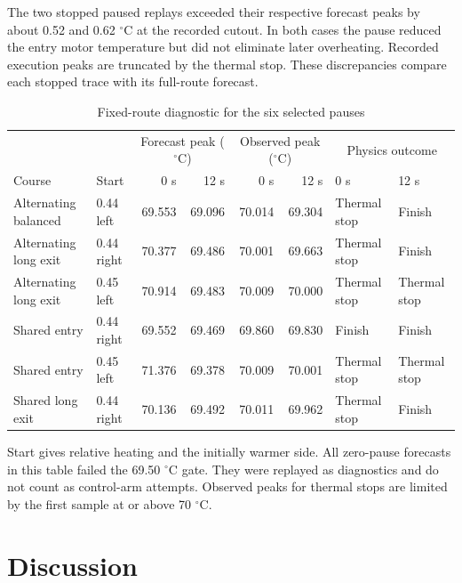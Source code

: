 \documentclass{ieeeaccess}
\begin{document}
The two stopped paused replays exceeded their respective forecast peaks by about 0.52 and 0.62 \ensuremath{{}^{\circ}\mathrm{C}} at the recorded cutout. In both cases the pause reduced the entry motor temperature but did not eliminate later overheating. Recorded execution peaks are truncated by the thermal stop. These discrepancies compare each stopped trace with its full-route forecast.

\begin{table}[!t]
\caption{Fixed-route diagnostic for the six selected pauses}
\label{tab:matched-same-route}
\centering
\footnotesize
\renewcommand{\arraystretch}{1.12}
\begin{tabular}{@{}llrrrrll@{}}
\hline
& & \multicolumn{2}{c}{Forecast peak (\ensuremath{{}^{\circ}\mathrm{C}})}
  & \multicolumn{2}{c}{Observed peak (\ensuremath{{}^{\circ}\mathrm{C}})}
  & \multicolumn{2}{c}{Physics outcome} \\
Course & Start & 0 s & 12 s & 0 s & 12 s & 0 s & 12 s \\
\hline
Alternating balanced & 0.44 left & 69.553 & 69.096 & 70.014 & 69.304 & Thermal stop & Finish \\
Alternating long exit & 0.44 right & 70.377 & 69.486 & 70.001 & 69.663 & Thermal stop & Finish \\
Alternating long exit & 0.45 left & 70.914 & 69.483 & 70.009 & 70.000 & Thermal stop & Thermal stop \\
Shared entry & 0.44 right & 69.552 & 69.469 & 69.860 & 69.830 & Finish & Finish \\
Shared entry & 0.45 left & 71.376 & 69.378 & 70.009 & 70.001 & Thermal stop & Thermal stop \\
Shared long exit & 0.44 right & 70.136 & 69.492 & 70.011 & 69.962 & Thermal stop & Finish \\
\hline
\end{tabular}

\smallskip
\parbox{.96\textwidth}{Start gives relative heating and the initially warmer side. All zero-pause forecasts in this table failed the 69.50 \ensuremath{{}^{\circ}\mathrm{C}} gate. They were replayed as diagnostics and do not count as control-arm attempts. Observed peaks for thermal stops are limited by the first sample at or above 70 \ensuremath{{}^{\circ}\mathrm{C}}.}
\end{table}


\section{Discussion}
\end{document}
